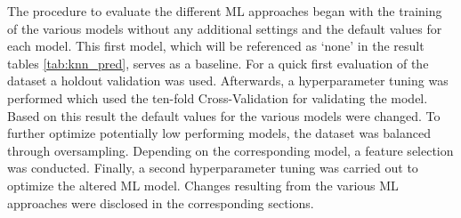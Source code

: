The procedure to evaluate the different ML approaches began with the training of the various models without any additional settings and the default values for each model. This first model, which will be referenced as \enquote*{none} in the result tables \ref{tab:knn_pred}, serves as a baseline. For a quick first evaluation of the dataset a holdout validation was used. Afterwards, a hyperparameter tuning was performed which used the ten-fold Cross-Validation for validating the model. %
Based on this result the default values for the various models were changed. To further optimize potentially low performing models, the dataset was balanced through oversampling. Depending on the corresponding model, a feature selection was conducted. Finally, a second hyperparameter tuning was carried out to optimize the altered ML model. Changes resulting from the various ML approaches were disclosed in the corresponding sections.


